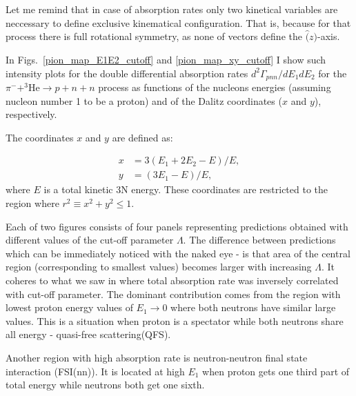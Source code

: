     Let me remind that in case of absorption rates only two kinetical variables are
    neccessary to define exclusive kinematical configuration. That is, because for that
    process there is full rotational symmetry, as none of vectors define the $\hat(z)$-axis.


    In Figs.~\ref{pion_map_E1E2_cutoff} and \ref{pion_map_xy_cutoff} I show such
    intensity plots for the double differential absorption rates
    $d^2 \Gamma_{pnn}/dE_1dE_2$ for the $\pi^- + ^3\text{He} \rightarrow p + n + n$
    process as functions of the nucleons energies (assuming nucleon number 1 to be a proton) and 
    of the Dalitz coordinates ($x$ and $y$), respectively.

    The coordinates $x$ and $y$ are defined as:

    \begin{align}
        x &= 3 (E_1 + 2E_2 - E)/E, \nonumber\\
        y &= (3E_1 - E)/E,
        \label{dalitz_xy}
    \end{align}
    where $E$ is a total kinetic 3N energy. 
    These coordinates are restricted to the region where $r^2 \equiv x^2 + y^2 \leq 1$.

    Each of two figures consists of four panels representing predictions obtained with different 
    values of the cut-off parameter $\Lambda$. The difference between predictions which can be immediately
    noticed with the naked eye - is that area of the central region (corresponding to smallest values)
    becomes larger with increasing $\Lambda$. It coheres to what we saw in 
    where total absorption rate was inversely correlated with cut-off parameter. The dominant contribution
    comes from the region with lowest proton energy values of $E_1 \rightarrow 0$ where both neutrons have similar large values.
    This is a situation when proton is a spectator while both neutrons share all energy
    - quasi-free scattering(QFS). 

    Another region with high absorption rate is neutron-neutron final state interaction (FSI(nn)).
    It is located at high $E_1$ when proton gets one third part of total energy while neutrons both get
    one sixth.
    
